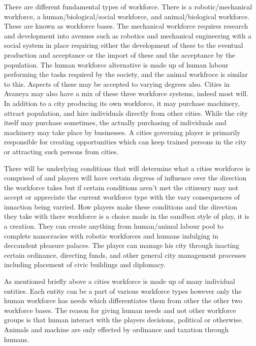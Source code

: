 There are different fundamental types of workforce. There is a robotic/mechanical workforce, a human/biological/social workforce, and animal/biological workforce. These are known as workforce bases. The mechanical workforce requires research and development into avenues such as robotics and mechanical engineering with a social system in place requiring either the development of these to the eventual production and acceptance or the import of these and the acceptance by the population. The human workforce alternative is made up of human labour performing the tasks required by the society, and the animal workfroce is similar to this. Aspects of these may be accepted to varying degrees also. Cities in Avaneya may also have a mix of these three workforce systems, indeed most will. In addition to a city producing its own workforce, it may purchase machinery, attract population, and hire individuals directly from other cities. While the city itself may purchase sometimes, the actually purchasing of individuals and machinery may take place by businesses. A cities governing player is primarily responsible for creating opportunities which can keep trained persons in the city or attracting such persons from cities. 

There will be underlying conditions that will determine what a cities workforce is comprised of and players will have certain degress of influence over the direction the workforce takes but if certain conditions aren't met the citizenry may not accept or appreciate the current workforce type with the vary consequences of innaction being varried. How players make these conditions and the direction they take with there workforce is a choice made in the sandbox style of play, it is a creation. They can create anything from human/animal labour pool to complete nanocracies with robotic workforces and humans indulging in deccandent pleasure palaces. The player can manage his city through inacting certain ordinance, directing funds, and other general city management processes including placement of civic buildings and diplomacy. 


As mentioned briefly above a cities workforce is made up of many individual entities. Each entity can be a part of various workforce types however only the human workforce has needs which differentiates them from other the other two workforce bases. The reason for giving human needs and not other workforce groups is that human interact with the players decisions, political or otherwise. Animals and machine are only effected by ordinance and taxation through humans. 

